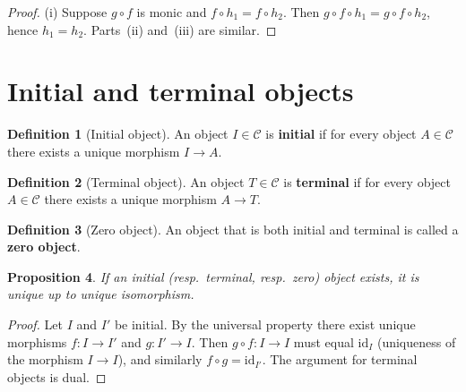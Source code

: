 \documentclass[a4paper,12pt]{book}
\newcommand{\id}{\mathrm{id}}
\theoremstyle{definition}
\newtheorem{definition}{Definition}[section]
\theoremstyle{plain}
\newtheorem{proposition}[definition]{Proposition}
\theoremstyle{remark}
\begin{document}
\begin{proof}
(i) Suppose $g\circ f$ is monic and $f\circ h_1 = f\circ h_2$.
Then $g\circ f\circ h_1 = g\circ f\circ h_2$, hence $h_1=h_2$.
Parts~(ii) and~(iii) are similar.
\end{proof}


\section{Initial and terminal objects}\label{sec:initial-terminal}

\begin{definition}[Initial object]\label{def:initial}
An object $I\in\mathcal{C}$ is \textbf{initial} if for every object
$A\in\mathcal{C}$ there exists a unique morphism $I\to A$.
\end{definition}

\begin{definition}[Terminal object]\label{def:terminal}
An object $T\in\mathcal{C}$ is \textbf{terminal} if for every object
$A\in\mathcal{C}$ there exists a unique morphism $A\to T$.
\end{definition}

\begin{definition}[Zero object]\label{def:zero-object}
An object that is both initial and terminal is called a
\textbf{zero object}.
\end{definition}

\begin{proposition}\label{prop:initial-terminal-unique}
If an initial (resp.\ terminal, resp.\ zero) object exists, it is unique
up to unique isomorphism.
\end{proposition}

\begin{proof}
Let $I$ and $I'$ be initial.  By the universal property there exist
unique morphisms $f\colon I\to I'$ and $g\colon I'\to I$.
Then $g\circ f\colon I\to I$ must equal $\id_I$ (uniqueness of the
morphism $I\to I$), and similarly $f\circ g = \id_{I'}$.
The argument for terminal objects is dual.
\end{proof}
\end{document}
